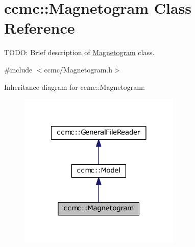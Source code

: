 \hypertarget{classccmc_1_1_magnetogram}{\section{ccmc\-:\-:Magnetogram Class Reference}
\label{classccmc_1_1_magnetogram}
}


T\-O\-D\-O\-: Brief description of \hyperlink{classccmc_1_1_magnetogram}{Magnetogram} class.  




{\ttfamily \#include $<$ccmc/\-Magnetogram.\-h$>$}



Inheritance diagram for ccmc\-:\-:Magnetogram\-:\nopagebreak
\begin{figure}[H]
\begin{center}
\leavevmode
\includegraphics[width=218pt]{classccmc_1_1_magnetogram__inherit__graph}
\end{center}
\end{figure}


